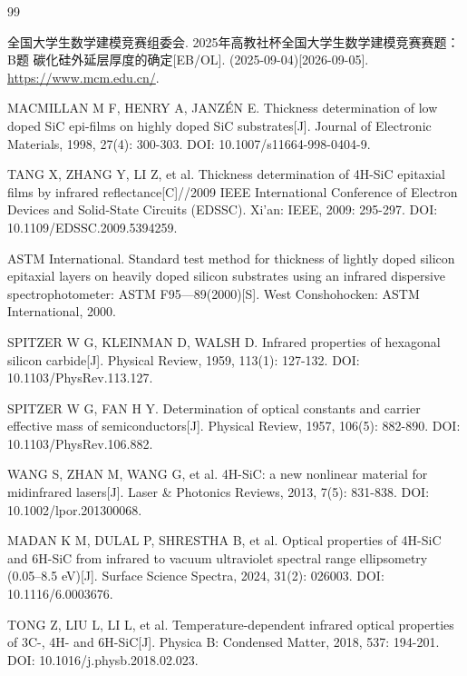 \documentclass[11pt,a4paper,fontset=fandol]{ctexart}
\begin{document}
\begin{thebibliography}{99}
    \raggedright
    \setlength{\itemsep}{0.15em}
    \small

     全国大学生数学建模竞赛组委会. 2025年高教社杯全国大学生数学建模竞赛赛题：B题 碳化硅外延层厚度的确定[EB/OL]. (2025-09-04)[2026-09-05]. \url{https://www.mcm.edu.cn/}.

     MACMILLAN M F, HENRY A, JANZÉN E. Thickness determination of low doped SiC epi-films on highly doped SiC substrates[J]. Journal of Electronic Materials, 1998, 27(4): 300-303. DOI: 10.1007/s11664-998-0404-9.

     TANG X, ZHANG Y, LI Z, et al. Thickness determination of 4H-SiC epitaxial films by infrared reflectance[C]//2009 IEEE International Conference of Electron Devices and Solid-State Circuits (EDSSC). Xi'an: IEEE, 2009: 295-297. DOI: 10.1109/EDSSC.2009.5394259.

     ASTM International. Standard test method for thickness of lightly doped silicon epitaxial layers on heavily doped silicon substrates using an infrared dispersive spectrophotometer: ASTM F95—89(2000)[S]. West Conshohocken: ASTM International, 2000.

     SPITZER W G, KLEINMAN D, WALSH D. Infrared properties of hexagonal silicon carbide[J]. Physical Review, 1959, 113(1): 127-132. DOI: 10.1103/PhysRev.113.127.

     SPITZER W G, FAN H Y. Determination of optical constants and carrier effective mass of semiconductors[J]. Physical Review, 1957, 106(5): 882-890. DOI: 10.1103/PhysRev.106.882.

     WANG S, ZHAN M, WANG G, et al. 4H-SiC: a new nonlinear material for midinfrared lasers[J]. Laser \& Photonics Reviews, 2013, 7(5): 831-838. DOI: 10.1002/lpor.201300068.

     MADAN K M, DULAL P, SHRESTHA B, et al. Optical properties of 4H-SiC and 6H-SiC from infrared to vacuum ultraviolet spectral range ellipsometry (0.05--8.5 eV)[J]. Surface Science Spectra, 2024, 31(2): 026003. DOI: 10.1116/6.0003676.

     TONG Z, LIU L, LI L, et al. Temperature-dependent infrared optical properties of 3C-, 4H- and 6H-SiC[J]. Physica B: Condensed Matter, 2018, 537: 194-201. DOI: 10.1016/j.physb.2018.02.023.


\end{thebibliography}
\end{document}
